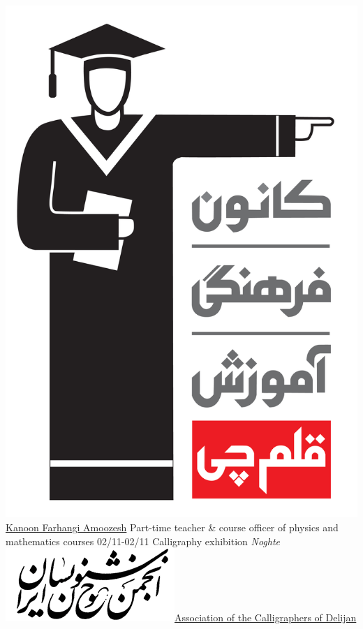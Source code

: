 \documentclass[a4paper]{./classes/friggeri-cv}
\begin{document}
\begin{entrylist}
        {\href{http://www.kanoon.ir/}{\includegraphics[scale=0.005]{../assets/images/logos/Kanoon_logo.png} Kanoon Farhangi Amoozesh}}
        {Part-time teacher \& course officer of physics and mathematics courses}
        \entry
        {02/11-02/11}
        {    Calligraphy exhibition \emph{Noghte}}
        {\href{http://calligraphers.ir/}{\includegraphics[scale=0.15]{../assets/images/logos/Khoshnevisan_logo.png}Association of the Calligraphers of Delijan}}

\end{entrylist}
\end{document}
